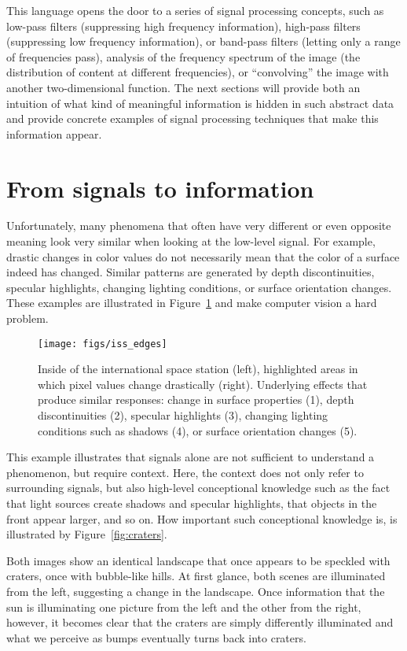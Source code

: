 This language opens the door to a series of signal processing concepts, such as low-pass filters (suppressing high frequency information), high-pass filters (suppressing low frequency information), or band-pass filters (letting only a range of frequencies pass), analysis of the frequency spectrum of the image (the distribution of content at different frequencies), or ``convolving'' the image with another two-dimensional function. The next sections will provide both an intuition of what kind of meaningful information is hidden in such abstract data and provide concrete examples of signal processing techniques that make this information appear.

\section{From signals to information}
Unfortunately, many phenomena that often have very different or even opposite meaning look very similar when looking at the low-level signal. For example, drastic changes in color values do not necessarily mean that the color of a surface indeed has changed. Similar patterns are generated by depth discontinuities, specular highlights, changing lighting conditions, or surface orientation changes. These examples are illustrated in Figure~\ref{fig:iss_edges} and make computer vision a hard problem.

\begin{figure}[!htb]
    \centering
    \texttt{[image: figs/iss\_edges]}
    \caption{Inside of the international space station (left), highlighted areas in which pixel values change drastically (right). Underlying effects that produce similar responses: change in surface properties (1), depth discontinuities (2), specular highlights (3), changing lighting conditions such as shadows (4), or surface orientation changes (5).
    \label{fig:iss_edges}}
\end{figure}

This example illustrates that signals alone are not sufficient to understand a phenomenon, but require context. Here, the context does not only refer to surrounding signals, but also high-level conceptional knowledge such as the fact that light sources create shadows and specular highlights, that objects in the front appear larger, and so on. How important such conceptional knowledge is, is illustrated by Figure~\ref{fig:craters}.

Both images show an identical landscape that once appears to be speckled with craters, once with bubble-like hills. At first glance, both scenes are illuminated from the left, suggesting a change in the landscape. Once information that the sun is illuminating one picture from the left and the other from the right, however, it becomes clear that the craters are simply differently illuminated and what we perceive as bumps eventually turns back into craters.

